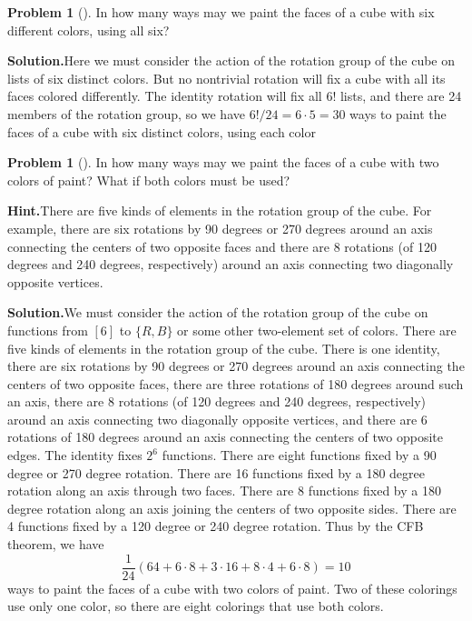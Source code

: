 \documentclass[10pt,]{book}
\theoremstyle{plain}
\theoremstyle{definition}
\newtheorem{activity}[project]{Problem}
\theoremstyle{definition}
\numberwithin{equation}{chapter}
\begin{document}
\begin{activity}[]\label{activity-304}
In how many ways may we paint the faces of a cube with six different colors, using all six?%
\par\medskip\noindent%
\textbf{Solution.}\quad Here we must consider the action of the rotation group of the cube on lists of six distinct colors. But no nontrivial rotation will fix a cube with all its faces colored differently. The identity rotation will fix all \(6!\) lists, and there are 24 members of the rotation group, so we have \(6!/24=6\cdot5=30\) ways to paint the faces of a cube with six distinct colors, using each color%
\end{activity}
\begin{activity}[]\label{activity-305}
In how many ways may we paint the faces of a cube with two colors of paint? What if both colors must be used?%
\par\medskip\noindent%
\textbf{Hint.}\quad There are five kinds of elements in the rotation group of the cube. For example, there are six rotations by 90 degrees or 270 degrees around an axis connecting the centers of two opposite faces and there are 8 rotations (of 120 degrees and 240 degrees, respectively) around an axis connecting two diagonally opposite vertices.%
\par\medskip\noindent%
\textbf{Solution.}\quad We must consider the action of the rotation group of the cube on functions from \([6]\) to \(\{R,B\}\) or some other two-element set of colors. There are five kinds of elements in the rotation group of the cube. There is one identity, there are six rotations by 90 degrees or 270 degrees around an axis connecting the centers of two opposite faces, there are three rotations of 180 degrees around such an axis, there are 8 rotations (of 120 degrees and 240 degrees, respectively) around an axis connecting two diagonally opposite vertices, and there are 6 rotations of 180 degrees around an axis connecting the centers of two opposite edges. The identity fixes \(2^6\) functions. There are eight functions fixed by a 90 degree or 270 degree rotation. There are 16 functions fixed by a 180 degree rotation along an axis through two faces. There are 8 functions fixed by a 180 degree rotation along an axis joining the centers of two opposite sides. There are 4 functions fixed by a 120 degree or 240 degree rotation. Thus by the CFB theorem, we have%
\begin{equation*}
\frac{1}{24}(64+6\cdot8 + 3\cdot16+ 8\cdot 4 +6\cdot8)= 10
\end{equation*}
ways to paint the faces of a cube with two colors of paint. Two of these colorings use only one color, so there are eight colorings that use both colors.%
\end{activity}
\end{document}
